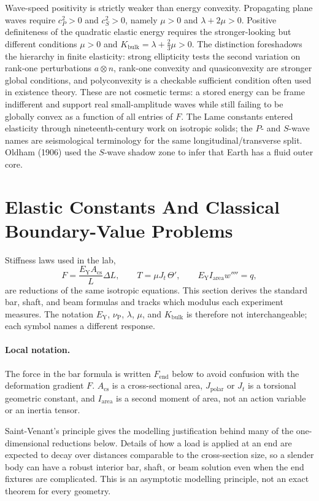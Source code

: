 Wave-speed positivity is strictly weaker than energy convexity. Propagating
plane waves require \(c_P^2>0\) and \(c_S^2>0\), namely
\(\mu>0\) and \(\lambda+2\mu>0\). Positive definiteness of the quadratic
elastic energy requires the stronger-looking but different conditions
\(\mu>0\) and \(K_{\mathrm{bulk}}=\lambda+\frac23\mu>0\). The distinction
foreshadows the hierarchy in finite elasticity: strong ellipticity tests the
second variation on rank-one perturbations \(a\otimes n\), rank-one convexity
and quasiconvexity are stronger global conditions, and polyconvexity is a
checkable sufficient condition often used in existence theory. These are not
cosmetic terms: a stored energy can be frame indifferent and support real
small-amplitude waves while still failing to be globally convex as a function
of all entries of \(F\).
The Lame constants entered elasticity through nineteenth-century work on
isotropic solids; the \(P\)- and \(S\)-wave names are seismological terminology
for the same longitudinal/transverse split. Oldham (1906) used the \(S\)-wave
shadow zone to infer that Earth has a fluid outer core.

\section{Elastic Constants And Classical Boundary-Value Problems}
\label{sec:elastic-constants-boundary-problems}

Stiffness laws used in the lab,
\[
  F=\frac{E_{\mathrm Y}A_{\mathrm{cs}}}{L}\Delta L,
  \qquad
  T=\mu J_t\,\Theta',
  \qquad
  E_{\mathrm Y}I_{\mathrm{area}}w''''=q,
\]
are reductions of the same isotropic equations. This section derives the
standard bar, shaft, and beam formulas and tracks which modulus each experiment
measures. The notation \(E_{\mathrm Y}\), \(\nu_{\mathrm P}\), \(\lambda\),
\(\mu\), and \(K_{\mathrm{bulk}}\) is therefore not interchangeable; each symbol
names a different response.

\paragraph{Local notation.}
The force in the bar formula is written \(F_{\mathrm{end}}\) below to avoid
confusion with the deformation gradient \(F\).  \(A_{\mathrm{cs}}\) is a
cross-sectional area, \(J_{\mathrm{polar}}\) or \(J_t\) is a torsional geometric
constant, and \(I_{\mathrm{area}}\) is a second moment of area, not an action
variable or an inertia tensor.

Saint-Venant's principle gives the modelling justification behind many of the
one-dimensional reductions below. Details of how a load is applied at an end
are expected to decay over distances comparable to the cross-section size, so a
slender body can have a robust interior bar, shaft, or beam solution even when
the end fixtures are complicated. This is an asymptotic modelling principle,
not an exact theorem for every geometry.

